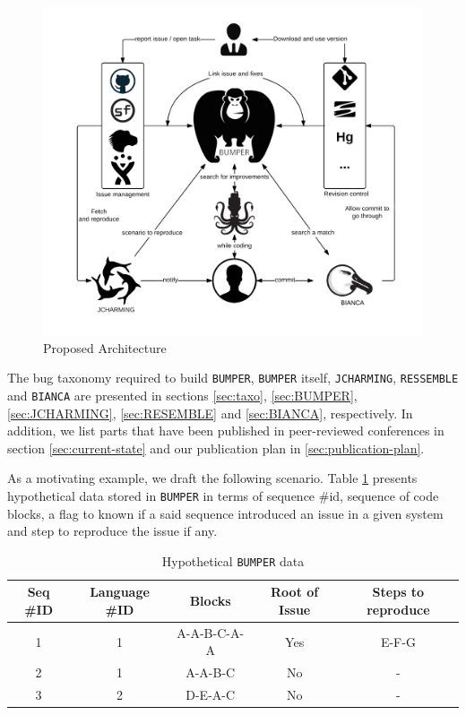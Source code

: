 \begin{figure}[h!]
	\centering
	\includegraphics[scale=0.9]{media/proposal.png}
	\caption{Proposed Architecture}
	\label{fig:proposal}
\end{figure}

The bug taxonomy required to build {\tt BUMPER}, {\tt BUMPER} itself, {\tt JCHARMING}, {\tt RESSEMBLE} and {\tt BIANCA} are presented in sections \ref{sec:taxo}, \ref{sec:BUMPER}, \ref{sec:JCHARMING}, \ref{sec:RESEMBLE} and \ref{sec:BIANCA}, respectively. In addition, we list parts that have been published in peer-reviewed conferences in section \ref{sec:current-state} and our publication plan in \ref{sec:publication-plan}.

As a motivating example, we draft the following scenario. Table \ref{tab:bumper-hypo} presents hypothetical data stored in {\tt BUMPER} in terms of sequence \#id, sequence of code blocks, a flag to known if a said sequence introduced an issue in a given system and step to reproduce the issue if any.

\begin{table}[h!]
\centering
\begin{tabular}{c|c|c|c|c}
Seq \#ID & Language \#ID & Blocks & Root of Issue & Steps to reproduce \\ \hline \hline
1        & 1             & A-A-B-C-A-A   & Yes  & E-F-G         \\
2        & 1             & A-A-B-C       & No   & -         \\
3        & 2             & D-E-A-C       & No &  - \\ \hline \hline
\end{tabular}
\caption{Hypothetical {\tt BUMPER} data}
\label{tab:bumper-hypo}
\end{table}

